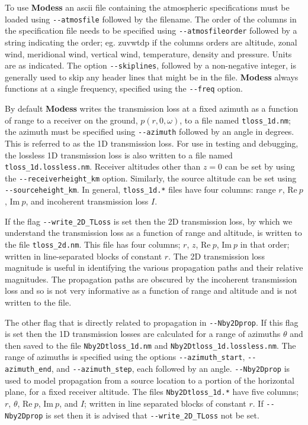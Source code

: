 To use {\bf Modess} an ascii file containing the atmospheric specifications must be loaded using \verb+--atmosfile+ followed by the filename. The order of the columns in the specification file needs to be specified using \verb+--atmosfileorder+ followed by a string indicating the order; eg. zuvwtdp if the columns orders are altitude, zonal wind, meridional wind, vertical wind, temperature, density and pressure. Units are as indicated. The option \verb+--skiplines+, followed by a non-negative integer, is generally used to skip any header lines that might be in the file. {\bf Modess} always functions at a single frequency, specified using the \verb+--freq+ option. 

By default {\bf Modess} writes the transmission loss at a fixed azimuth as a function of range to a receiver on the ground, $p(r,0,\omega)$, to a file named \verb+tloss_1d.nm+; the azimuth must be specified using \verb+--azimuth+ followed by an angle in degrees. This is referred to as the 1D transmission loss. For use in testing and debugging, the lossless 1D transmission loss is also written to a file named \verb+tloss_1d.lossless.nm+. Receiver altitudes other than $z=0$ can be set by using the \verb+--receiverheight_km+ option. Similarly, the source altitude can be set using \verb+--sourceheight_km+. In general, \verb+tloss_1d.*+ files have four columns: range $r$, $\text{Re}\ p$, $\text{Im}\ p$, and incoherent transmission loss $I$. 

If the flag \verb+--write_2D_TLoss+ is set then the 2D transmission loss, by which we understand the transmission loss as a function of range and altitude, is written to the file \verb+tloss_2d.nm+.  This file has four columns; $r$, $z$, $\text{Re}\ p$, $\text{Im}\ p$ in that order; written in line-separated blocks of constant $r$. The 2D transmission loss magnitude is useful in identifying the various propagation paths and their relative magnitudes. The propagation paths are obscured by the incoherent transmission loss and so is not very informative as a function of range and altitude and is not written to the file. 

The other flag that is directly related to propagation in \verb+--Nby2Dprop+. If this flag is set then the 1D transmission losses are calculated for a range of azimuths $\theta$ and then saved to the file \verb+Nby2Dtloss_1d.nm+ and \verb+Nby2Dtloss_1d.lossless.nm+. The range of azimuths is specified using the options \verb+--azimuth_start+, \verb+--azimuth_end+, and \verb+--azimuth_step+, each followed by an angle. \verb+--Nby2Dprop+ is used to model propagation from a source location to a portion of the horizontal plane, for a fixed receiver altitude. The files \verb+Nby2Dtloss_1d.*+ have five columns; $r$, $\theta$, $\text{Re}\ p$, $\text{Im}\ p$, and $I$; written in line separated blocks of constant $r$. If \verb+--Nby2Dprop+ is set then it is advised that \verb+--write_2D_TLoss+ not be set. 

